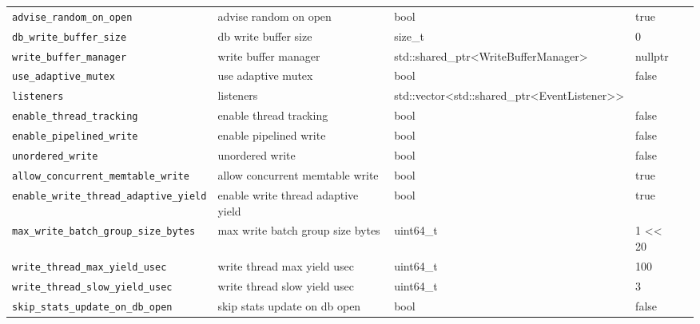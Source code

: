 {{\begin{longtable}{@{}p{3.4cm}p{5.0cm}p{3.6cm}p{2.5cm}p{2.6cm}@{}}
    \texttt{advise\_random\_on\_open}
    & advise random on open
    & bool
    & true
    & \\

    \texttt{db\_write\_buffer\_size}
    & db write buffer size
    & size\_t
    & 0
    & \\

    \texttt{write\_buffer\_manager}
    & write buffer manager
    & std::shared\_ptr\textless{}WriteBufferManager\textgreater{}
    & nullptr
    & \\

    \texttt{use\_adaptive\_mutex}
    & use adaptive mutex
    & bool
    & false
    & \\

    \texttt{listeners}
    & listeners
    & std::vector\textless{}std::shared\_ptr\textless{}EventListener\textgreater{}\textgreater{}
    & 
    & \\

    \texttt{enable\_thread\_tracking}
    & enable thread tracking
    & bool
    & false
    & \\

    \texttt{enable\_pipelined\_write}
    & enable pipelined write
    & bool
    & false
    & \\

    \texttt{unordered\_write}
    & unordered write
    & bool
    & false
    & \\

    \texttt{allow\_concurrent\_memtable\_write}
    & allow concurrent memtable write
    & bool
    & true
    & \\

    \texttt{enable\_write\_thread\_adaptive\_yield}
    & enable write thread adaptive yield
    & bool
    & true
    & \\

    \texttt{max\_write\_batch\_group\_size\_bytes}
    & max write batch group size bytes
    & uint64\_t
    & 1 \textless{}\textless{} 20
    & \\

    \texttt{write\_thread\_max\_yield\_usec}
    & write thread max yield usec
    & uint64\_t
    & 100
    & \\

    \texttt{write\_thread\_slow\_yield\_usec}
    & write thread slow yield usec
    & uint64\_t
    & 3
    & \\

    \texttt{skip\_stats\_update\_on\_db\_open}
    & skip stats update on db open
    & bool
    & false
    & \\


\end{longtable}}}
